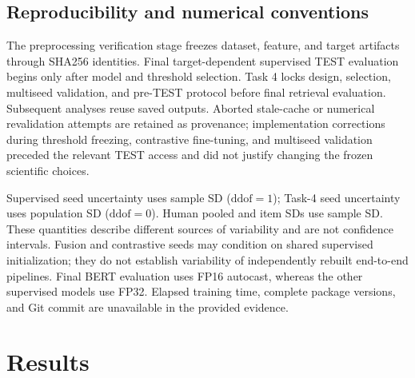 \documentclass[conference]{IEEEtran}
\begin{document}
\subsection{Reproducibility and numerical conventions}
The preprocessing verification stage freezes dataset, feature, and target artifacts through SHA256 identities. Final target-dependent supervised TEST evaluation begins only after model and threshold selection. Task 4 locks design, selection, multiseed validation, and pre-TEST protocol before final retrieval evaluation. Subsequent analyses reuse saved outputs. Aborted stale-cache or numerical revalidation attempts are retained as provenance; implementation corrections during threshold freezing, contrastive fine-tuning, and multiseed validation preceded the relevant TEST access and did not justify changing the frozen scientific choices.

Supervised seed uncertainty uses sample SD ($\mathrm{ddof}=1$); Task-4 seed uncertainty uses population SD ($\mathrm{ddof}=0$). Human pooled and item SDs use sample SD. These quantities describe different sources of variability and are not confidence intervals. Fusion and contrastive seeds may condition on shared supervised initialization; they do not establish variability of independently rebuilt end-to-end pipelines. Final BERT evaluation uses FP16 autocast, whereas the other supervised models use FP32. Elapsed training time, complete package versions, and Git commit are unavailable in the provided evidence.

\section{Results}\label{sec:results}
\end{document}
